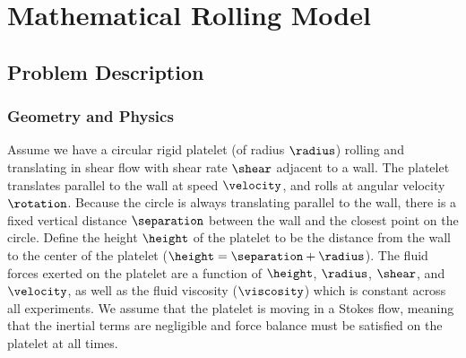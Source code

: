 
\chapter{Mathematical Rolling Model}

\section{Problem Description}
\label{sec:problem-description}

\subsection{Geometry and Physics}
\label{sec:geometry-physics}

Assume we have a circular rigid platelet (of radius $\radius$) rolling
and translating in shear flow with shear rate $\shear$ adjacent to a
wall. The platelet translates parallel to the wall at speed
$\velocity$, and rolls at angular velocity $\rotation$. Because the
circle is always translating parallel to the wall, there is a fixed
vertical distance $\separation$ between the wall and the closest point
on the circle. Define the height $\height$ of the platelet to be the
distance from the wall to the center of the platelet ($\height =
\separation + \radius$). The fluid forces exerted on the platelet are
a function of $\height$, $\radius$, $\shear$, and $\velocity$, as well
as the fluid viscosity ($\viscosity$) which is constant across all
experiments. We assume that the platelet is moving in a Stokes flow,
meaning that the inertial terms are negligible and force balance must
be satisfied on the platelet at all times.

